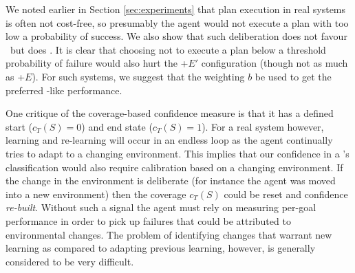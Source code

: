 We noted earlier in Section \ref{sec:experiments} that plan execution
in real systems is often not cost-free, so presumably the agent would
not execute a plan with too low a probability of success. We also show
that such deliberation does not favour \CL\ but does \BUL. It is clear
that choosing not to execute a plan below a threshold probability of
failure would also hurt the \CL+$E'$ configuration (though
not as much as \CL+$E$). For such systems, we suggest that the
weighting $b$ be used to get the preferred \BUL-like performance. 

One critique of the coverage-based confidence measure is that it has a
defined start ($c_T(S)=0$) and end state ($c_T(S)=1$). For a real
system however, learning and re-learning will occur in an endless loop
as the agent continually tries to adapt to a changing
environment. This implies that our confidence in a \dt's
classification would also require calibration based on a changing
environment. If the change in the environment is deliberate (for
instance the agent was moved into a new environment) then the coverage
$c_T(S)$ could be reset and confidence \textit{re-built}. Without such
a signal the agent must rely on measuring per-goal performance in
order to pick up failures that could be attributed to environmental
changes. The problem of identifying changes that warrant new learning
as compared to adapting previous learning, however, is generally
considered to be very difficult.

